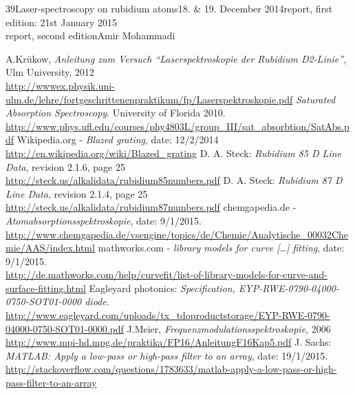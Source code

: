 \documentclass[a4paper, parskip=half, 12pt, bibliography=totocnumbered]{scrartcl}
\begin{document}
{39}{Laser-spectroscopy on rubidium atoms}{18. \& 19. December 2014}{report, first edition: 21st January 2015\\report, second edition}{Amir Mohammadi}{}





\begin{thebibliography}{10}
 A.Krükow, \emph{Anleitung zum Versuch ``Laserspektroskopie der Rubidium D2-Linie''}, Ulm University, 2012\\
\url{http://wwwex.physik.uni-ulm.de/lehre/fortgeschrittenenpraktikum/fp/Laserspektroskopie.pdf}
 \emph{Saturated Absorption Spectroscopy}. University of Florida 2010.\\
\url{http://www.phys.ufl.edu/courses/phy4803L/group_III/sat_absorbtion/SatAbs.pdf}
 Wikipedia.org - \emph{Blazed grating}, date: 12/2/2014\\
\url{http://en.wikipedia.org/wiki/Blazed_grating}
 D. A. Steck: \emph{Rubidium 85 D Line Data}, revision 2.1.6, page 25\\
\url{http://steck.us/alkalidata/rubidium85numbers.pdf}
 D. A. Steck: \emph{Rubidium 87 D Line Data}, revision 2.1.4, page 25\\
\url{http://steck.us/alkalidata/rubidium87numbers.pdf}
 chemgapedia.de - \emph{Atomabsorptionsspektroskopie}, date: 9/1/2015.\\
\url{http://www.chemgapedia.de/vsengine/topics/de/Chemie/Analytische_00032Chemie/AAS/index.html}
 mathworks.com - \emph{library models for curve [\dots] fitting}, date: 9/1/2015.\\
\url{http://de.mathworks.com/help/curvefit/list-of-library-models-for-curve-and-surface-fitting.html}
 Eagleyard photonics: \emph{Specification, EYP-RWE-0790-04000-0750-SOT01-0000 diode}.\\
\url{http://www.eagleyard.com/uploads/tx_tdoproductstorage/EYP-RWE-0790-04000-0750-SOT01-0000.pdf}
 J.Meier, \emph{Frequenzmodulationsspektroskopie}, 2006\\
\url{http://www.mpi-hd.mpg.de/praktika/FP16/AnleitungF16Kap5.pdf}
 J. Sachs: \emph{MATLAB: Apply a low-pass or high-pass filter to an array}, date: 19/1/2015.\\
\url{http://stackoverflow.com/questions/1783633/matlab-apply-a-low-pass-or-high-pass-filter-to-an-array}
\end{thebibliography}
\end{document}
